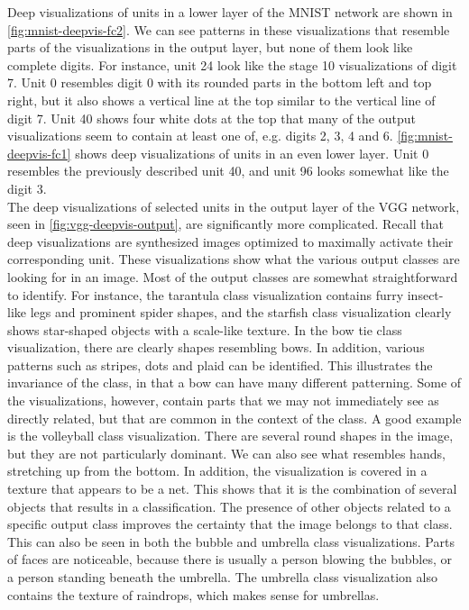\noindent Deep visualizations of units in a lower layer of the MNIST network are shown in \autoref{fig:mnist-deepvis-fc2}. We can see patterns in these visualizations that resemble parts of the visualizations in the output layer, but none of them look like complete digits. For instance, unit 24 look like the stage 10 visualizations of digit 7. Unit 0 resembles digit 0 with its rounded parts in the bottom left and top right, but it also shows a vertical line at the top similar to the vertical line of digit 7. Unit 40 shows four white dots at the top that many of the output visualizations seem to contain at least one of, e.g. digits 2, 3, 4 and 6. \autoref{fig:mnist-deepvis-fc1} shows deep visualizations of units in an even lower layer. Unit 0 resembles the previously described unit 40, and unit 96 looks somewhat like the digit 3.\\


\noindent The deep visualizations of selected units in the output layer of the VGG network, seen in \autoref{fig:vgg-deepvis-output}, are significantly more complicated. Recall that deep visualizations are synthesized images optimized to maximally activate their corresponding unit. These visualizations show what the various output classes are looking for in an image. Most of the output classes are somewhat straightforward to identify. For instance, the tarantula class visualization contains furry insect-like legs and prominent spider shapes, and the starfish class visualization clearly shows star-shaped objects with a scale-like texture. In the bow tie class visualization, there are clearly shapes resembling bows. In addition, various patterns such as stripes, dots and plaid can be identified. This illustrates the invariance of the class, in that a bow can have many different patterning. Some of the visualizations, however, contain parts that we may not immediately see as directly related, but that are common in the context of the class. A good example is the volleyball class visualization. There are several round shapes in the image, but they are not particularly dominant. We can also see what resembles hands, stretching up from the bottom. In addition, the visualization is covered in a texture that appears to be a net. This shows that it is the combination of several objects that results in a classification. The presence of other objects related to a specific output class improves the certainty that the image belongs to that class. This can also be seen in both the bubble and umbrella class visualizations. Parts of faces are noticeable, because there is usually a person blowing the bubbles, or a person standing beneath the umbrella. The umbrella class visualization also contains the texture of raindrops, which makes sense for umbrellas. \\

